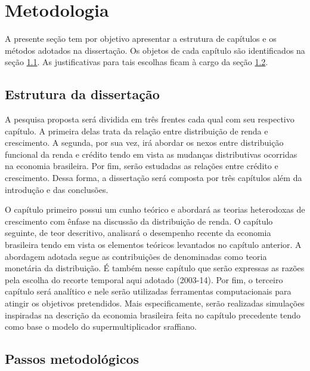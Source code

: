 {\let\clearpage\relax \chapter{Metodologia}\label{Metodo}}

A presente seção tem por objetivo apresentar a estrutura de capítulos e os métodos adotados na dissertação. Os objetos de cada capítulo são identificados na seção \ref{estrut}.
As justificativas para tais escolhas ficam à cargo da seção \ref{passos}. 

\section{Estrutura da dissertação}\label{estrut}
A pesquisa proposta será dividida em três frentes cada qual com seu respectivo capítulo.
A primeira delas trata da relação entre distribuição de renda e crescimento. A segunda, por sua vez, irá abordar os nexos entre distribuição funcional da renda e crédito tendo em vista as mudanças distributivas ocorridas na economia brasileira. Por fim, serão estudadas as relações entre crédito e crescimento. 
Dessa forma, a dissertação será composta por três capítulos além da introdução e das conclusões.  

O capítulo primeiro possui um cunho teórico e abordará as teorias heterodoxas de crescimento com ênfase na discussão da distribuição de renda. O capítulo seguinte, de teor descritivo, analisará o desempenho recente da economia brasileira tendo em vista os elementos teóricos levantados no capítulo anterior. A abordagem adotada segue as contribuições de \textcite{pivetti_essay_1992} denominadas como teoria monetária da distribuição. É também nesse capítulo que serão expressas as razões pela escolha do recorte temporal aqui adotado (2003-14). Por fim, o terceiro capítulo será analítico e nele serão utilizadas ferramentas computacionais para atingir os objetivos pretendidos. Mais especificamente, serão realizadas simulações inspiradas na descrição da economia brasileira feita no capítulo precedente tendo como base o modelo do supermultiplicador sraffiano.

\section{Passos metodológicos}\label{passos}
